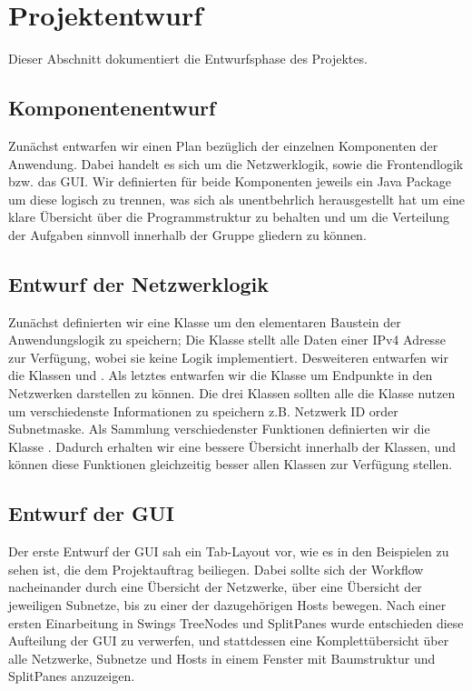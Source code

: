 \section{Projektentwurf}
Dieser Abschnitt dokumentiert die Entwurfsphase des Projektes.

\subsection{Komponentenentwurf}
Zunächst entwarfen wir einen Plan bezüglich der einzelnen Komponenten der Anwendung.
Dabei handelt es sich um die Netzwerklogik, sowie die Frontendlogik bzw. das GUI.
Wir definierten für beide Komponenten jeweils ein Java Package um diese logisch zu trennen, was
sich als unentbehrlich herausgestellt hat um eine klare Übersicht über die Programmstruktur zu behalten
und um die Verteilung der Aufgaben sinnvoll innerhalb der Gruppe gliedern zu können.

\subsection{Entwurf der Netzwerklogik}
Zunächst definierten wir eine Klasse um den elementaren Baustein der Anwendungslogik zu speichern;
Die Klasse  stellt alle Daten einer IPv4 Adresse zur Verfügung,
wobei sie keine Logik implementiert. Desweiteren entwarfen wir die Klassen  und .
Als letztes entwarfen wir die Klasse  um Endpunkte in den Netzwerken darstellen zu können.
Die drei Klassen sollten alle die Klasse  nutzen um verschiedenste Informationen
zu speichern z.B. Netzwerk ID order Subnetmaske.
Als Sammlung verschiedenster Funktionen definierten wir die Klasse .
Dadurch erhalten wir eine bessere Übersicht innerhalb der Klassen, und können diese Funktionen gleichzeitig
besser allen Klassen zur Verfügung stellen.

\subsection{Entwurf der GUI}
Der erste Entwurf der GUI sah ein Tab-Layout vor, wie es in den Beispielen zu sehen ist,
die dem Projektauftrag beiliegen. Dabei sollte sich der Workflow nacheinander durch eine
Übersicht der Netzwerke, über eine Übersicht der jeweiligen Subnetze, bis zu einer der
dazugehörigen Hosts bewegen. Nach einer ersten Einarbeitung in Swings TreeNodes und SplitPanes
wurde entschieden diese Aufteilung der GUI zu verwerfen, und stattdessen eine Komplettübersicht über 
alle Netzwerke, Subnetze und Hosts in einem Fenster mit Baumstruktur und SplitPanes anzuzeigen.